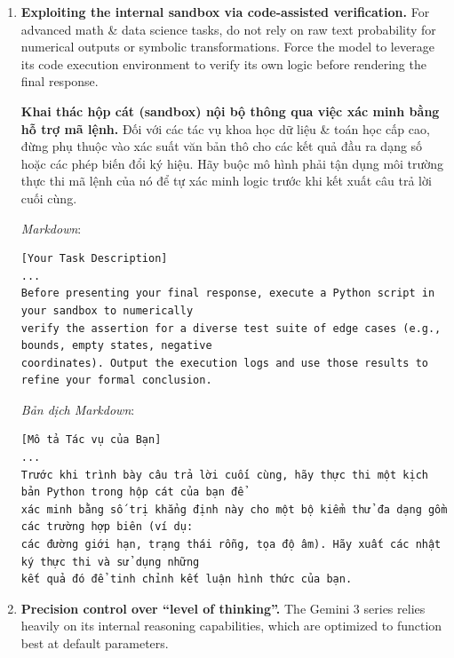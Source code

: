 \documentclass{article}
\begin{document}
\begin{enumerate}
	\textit{Biased}: ``Prove that the fractional finite-difference operator holds under constraint $C$.''
	
	\textit{Thiên kiến}: "Chứng minh rằng toán tử sai phân hữu hạn cấp phân số thỏa mãn dưới ràng buộc $C$."
	
	\textit{Balanced}: ``Evaluate the validity of the finite-difference operator under constraint $C$. Simultaneously attempt to construct a formal proof of the assertion \& engineer a minimal, specific counterexample to refute it. Present whichever pathway yields absolute mathematical consistency.''
	
	\textit{Cân bằng}: "Đánh giá tính hợp lệ của toán tử sai phân hữu hạn dưới ràng buộc $C$. Đồng thời nỗ lực xây dựng một chứng minh hình thức cho khẳng định này \& thiết kế một phản ví dụ cụ thể, tối giản để bác bỏ nó. Hãy trình bày bất kỳ hướng đi nào mang lại sự nhất quán toán học tuyệt đối."
	\item \textbf{Exploiting the internal sandbox via code-assisted verification.} For advanced math \& data science tasks, do not rely on raw text probability for numerical outputs or symbolic transformations. Force the model to leverage its code execution environment to verify its own logic before rendering the final response.
	
	\textbf{Khai thác hộp cát (sandbox) nội bộ thông qua việc xác minh bằng hỗ trợ mã lệnh.} Đối với các tác vụ khoa học dữ liệu \& toán học cấp cao, đừng phụ thuộc vào xác suất văn bản thô cho các kết quả đầu ra dạng số hoặc các phép biến đổi ký hiệu. Hãy buộc mô hình phải tận dụng môi trường thực thi mã lệnh của nó để tự xác minh logic trước khi kết xuất câu trả lời cuối cùng.
	
	\textit{Markdown}:
	\begin{verbatim}
[Your Task Description]
...
Before presenting your final response, execute a Python script in your sandbox to numerically
verify the assertion for a diverse test suite of edge cases (e.g., bounds, empty states, negative
coordinates). Output the execution logs and use those results to refine your formal conclusion.
	\end{verbatim}
	
	\textit{Bản dịch Markdown}:
	\begin{verbatim}
[Mô tả Tác vụ của Bạn]
...
Trước khi trình bày câu trả lời cuối cùng, hãy thực thi một kịch bản Python trong hộp cát của bạn để
xác minh bằng số trị khẳng định này cho một bộ kiểm thử đa dạng gồm các trường hợp biên (ví dụ: 
các đường giới hạn, trạng thái rỗng, tọa độ âm). Hãy xuất các nhật ký thực thi và sử dụng những
kết quả đó để tinh chỉnh kết luận hình thức của bạn.
	\end{verbatim}
	\item \textbf{Precision control over ``level of thinking''.} The Gemini 3 series relies heavily on its internal reasoning capabilities, which are optimized to function best at default parameters.
	

\end{enumerate}
\end{document}
